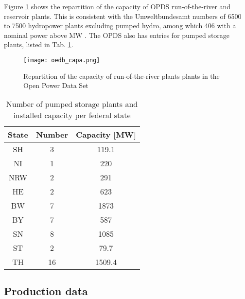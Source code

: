 Figure \ref{oedb_capa} shows the repartition of the capacity of OPDS run-of-the-river and reservoir plants. This is consistent with the Umweltbundesamt numbers of 6500 to 7500 hydropower plants excluding pumped hydro, among which 406 with a nominal power above \unit[1]{MW} \cite{uba_wasserkraft}. The OPDS also has entries for pumped storage plants, listed in Tab. \ref{oedb_pump}.

\begin{figure}[H]
\centering
\texttt{[image: oedb\_capa.png]}
\caption[Repartition of the capacity of run-of-the-river and reservoir plants in the Open Power Data Set]{Repartition of the capacity of run-of-the-river plants plants in the Open Power Data Set}
\label{oedb_capa}
\end{figure}

\begin{table} [H]
\footnotesize
  \centering
  \caption[Number of pumped storage plants and installed capacity per federal state]{Number of pumped storage plants and installed capacity per federal state \cite{oedb}}
  \label{oedb_pump}
  \begin{tabular}{|c|cc| }
  \hline
  \textbf{State} & Number 	& 	Capacity [\unit{MW}] 	\\
  \hline
  SH	&	3	&	119.1	\\
  NI	&	1	&	220	\\
  NRW	&	2	&	291	\\
  HE	&	2	&	623	\\
  BW	&	7	&	1873	\\	
  BY	&	7	&	587	\\
  SN	&	8	&	1085	\\
  ST	&	2	&	79.7	\\
  TH	&	16	&	1509.4	\\
  \hline
  \end{tabular}
\end{table}

\subsection{Production data}
\label{sub:prod_data}

